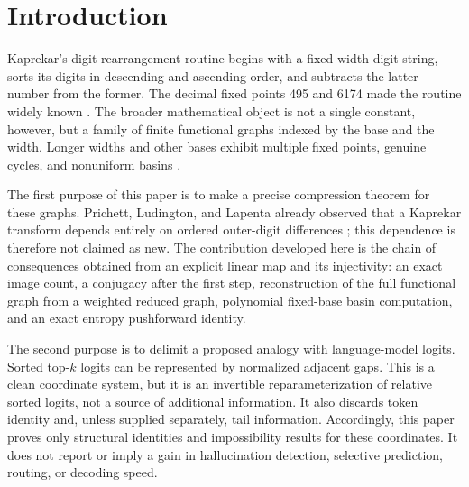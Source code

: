 \documentclass[11pt]{article}
\theoremstyle{definition}
\theoremstyle{remark}
\newcommand{\1}{\mathbf{1}}
\begin{document}
\section{Introduction}

Kaprekar's digit-rearrangement routine begins with a fixed-width digit string,
sorts its digits in descending and ascending order, and subtracts the latter
number from the former.  The decimal fixed points 495 and 6174 made the routine
widely known \cite{kaprekar1949,kaprekar1955}.  The broader mathematical object
is not a single constant, however, but a family of finite functional graphs
indexed by the base and the width.  Longer widths and other bases exhibit
multiple fixed points, genuine cycles, and nonuniform basins
\cite{hasse1978,prichett1981,walden2005,kay2022,kay2024}.

The first purpose of this paper is to make a precise compression theorem for
these graphs.  Prichett, Ludington, and Lapenta already observed that a
Kaprekar transform depends entirely on ordered outer-digit differences
\cite{prichett1981}; this dependence is therefore not claimed as new.  The
contribution developed here is the chain of consequences obtained from an
explicit linear map and its injectivity: an exact image count, a conjugacy
after the first step, reconstruction of the full functional graph from a
weighted reduced graph, polynomial fixed-base basin computation, and an exact
entropy pushforward identity.

The second purpose is to delimit a proposed analogy with language-model
logits.  Sorted top-$k$ logits can be represented by normalized adjacent gaps.
This is a clean coordinate system, but it is an invertible reparameterization
of relative sorted logits, not a source of additional information.  It also
discards token identity and, unless supplied separately, tail information.
Accordingly, this paper proves only structural identities and impossibility
results for these coordinates.  It does not report or imply a gain in
hallucination detection, selective prediction, routing, or decoding speed.
\end{document}
